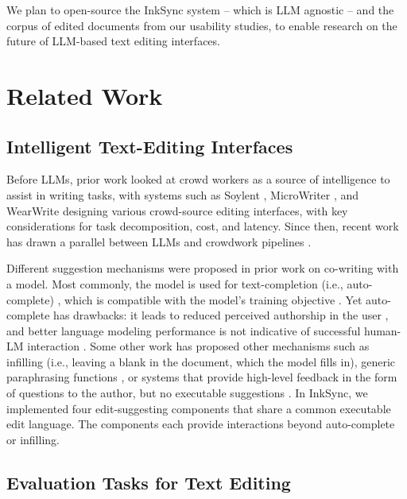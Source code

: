 \documentclass[manuscript]{acmart}
\begin{document}
We plan to open-source the InkSync system -- which is LLM agnostic -- and the corpus of edited documents from our usability studies, to enable research on the future of LLM-based text editing interfaces.

\section{Related Work} \label{sec:related_work}

\subsection{Intelligent Text-Editing Interfaces} \label{sec:rel_work_interfaces}

Before LLMs, prior work looked at crowd workers as a source of intelligence to assist in writing tasks, with systems such as Soylent \cite{bernstein2010soylent}, MicroWriter \cite{teevan2016supporting}, and WearWrite \cite{nebeling2016wearwrite} designing various crowd-source editing interfaces, with key considerations for task decomposition, cost, and latency. Since then, recent work has drawn a parallel between LLMs and crowdwork pipelines \cite{wu2023llms}.

Different suggestion mechanisms were proposed in prior work on co-writing with a model. Most commonly, the model is used for text-completion (i.e., auto-complete) \cite{coenen2021wordcraft,lee2022coauthor,buschek2021impact,calderwood2020novelists}, which is compatible with the model's training objective \cite{wu2018smart}. Yet auto-complete has drawbacks: it leads to reduced perceived authorship in the user \cite{lehmann2022suggestion}, and better language modeling performance is not indicative of successful human-LM interaction \cite{lee2022evaluating}. Some other work has proposed other mechanisms such as infilling \cite{coenen2021wordcraft, ippolito2022case} (i.e., leaving a blank in the document, which the model fills in), generic paraphrasing functions \cite{coenen2021wordcraft}, or systems that provide high-level feedback in the form of questions to the author, but no executable suggestions \cite{kim2023repurposing}. In InkSync, we implemented four edit-suggesting components that share a common executable edit language. The components each provide interactions beyond auto-complete or infilling.

\subsection{Evaluation Tasks for Text Editing} \label{sec:rel_work_tasks}
\end{document}
